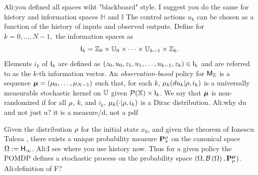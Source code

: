\documentclass{ifacconf}
\newcommand{\red}[1]{{\color{red} #1}}
\renewcommand{\axx}[1]{{\color{orange} Ali:#1}}
\begin{document}
  
  
  \axx{you defined all spaces wiht "blackboard" style. I suggest you do the same for history and information spaces $\mathbb{H}$ and $\mathbb{I}$}
The control actions $u_k$ can be chosen as a function of the history of inputs and observed outputs.  
Define for $k=0,\ldots,N-1,$ the information spaces as
\[{\mathsf{I}}_k={\mathbb{Z}}_0\times{\mathbb{U}}_0\times\dots\times{\mathbb{U}}_{k-1}\times{\mathbb{Z}}_k.\]
Elements $i_k$ of ${\mathsf{I}}_k$ are defined as $(z_0,u_0,z_1,u_1,\ldots,u_{k-1},z_k)\in{\mathsf{I}}_k$ and are referred to as the $k$-th information vector. 
	An \emph{observation-based} policy for $\mathsf{M}_{{\mathbb{Z}}}$ is a sequence ${\boldsymbol{\mu}}=({\mu}_0,\ldots,{\mu}_{N-1})$ such that, for each $k$, ${\mu}_k(du_k|\rho, i_k)$ is a universally measurable stochastic kernel on ${\mathbb{U}}$  given $\mathcal{P}({\mathbb{X}})\times {\mathsf{I}}_k$.
	We say that ${\boldsymbol{\mu}}$ is non-randomized if for all $\rho$, $k$, and $i_k$,    ${\mu}_k(\cdot|\rho, i_k)$ is a Dirac distribution.
\axx{why du and not just u?}\red{it is a measure/d, not a pdf}

Given the distribution $\rho$ for the initial state $x_0$,  and given the theorem of Ionescu Tulcea \citep{hll1996}, there exists a unique probability measure $\mathbf{P}_\pi^\rho$ on the canonical space $\Omega:={\mathsf{H}}_\infty$. \axx{I see where you use history now.} Thus for a given policy the POMDP defines a stochastic process on the probability space  
 $(\Omega,\mathcal{B}\left(\Omega\right),\mathbf{P}_\rho^{\boldsymbol{\mu}})$. \axx{definition of F?}
%
%
\end{document}
